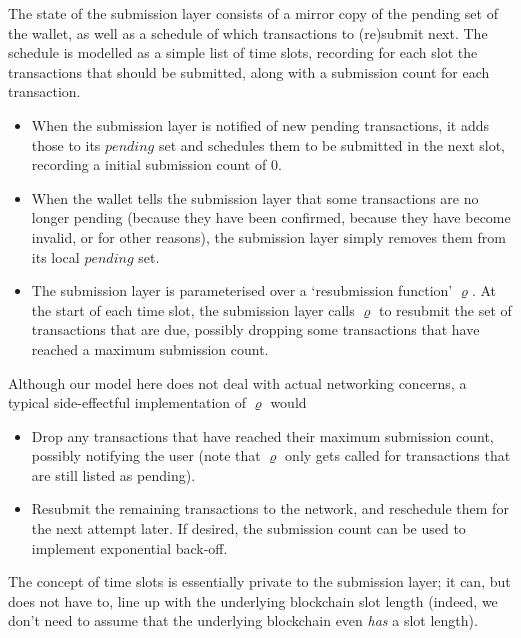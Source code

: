 \documentclass{article}
\numberwithin{equation}{lemma}
\begin{document}
The state of the submission layer consists of a mirror copy of the pending set
of the wallet, as well as a schedule of which transactions to (re)submit next.
The schedule is modelled as a simple list of time slots, recording for each slot
the transactions that should be submitted, along with a submission count for
each transaction.
%
\begin{itemize}
\item When the submission layer is notified of new pending transactions,
it adds those to its $\mathit{pending}$ set and schedules them to be submitted
in the next slot, recording a initial submission count of 0.
\item When the wallet tells the submission layer that some transactions are
no longer pending (because they have been confirmed, because they have become
invalid, or for other reasons), the submission layer simply removes them
from its local $\mathit{pending}$ set.
\item The submission layer is parameterised over a `resubmission function'
$\varrho$. At the start of each time slot, the submission layer calls $\varrho$
to resubmit the set of transactions that are due, possibly dropping some
transactions that have reached a maximum submission count.
\end{itemize}

Although our model here does not deal with actual networking concerns, a
typical side-effectful implementation of $\varrho$ would
%
\begin{itemize}
\item Drop any transactions that have reached their maximum submission
count, possibly notifying the user
(note that $\varrho$ only gets called for transactions that are still listed as
pending).
\item Resubmit the remaining transactions to the network, and reschedule them
for the next attempt later. If desired, the submission count can be used to
implement exponential back-off.
\end{itemize}

The concept of time slots is essentially private to the submission layer; it
can, but does not have to, line up with the underlying blockchain slot length
(indeed, we don't need to assume that the underlying blockchain even \emph{has}
a slot length).
\end{document}
